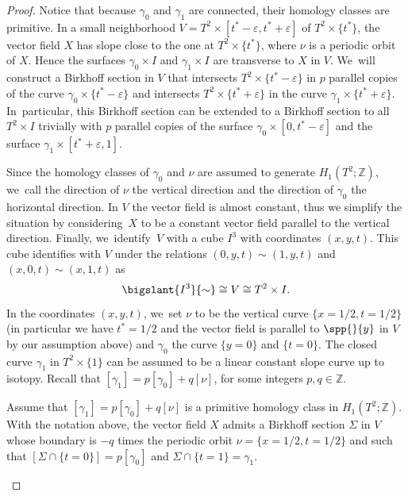 \begin{proof}
{Notice that because $\gamma_0$ and $\gamma_1$ are connected, their homology classes are primitive.} In a small neighborhood $V=T^2\times [t^*-\varepsilon,t^*+\varepsilon]$ of $T^2 \times \{t^*\}$, the vector field $X$ has slope close to the one at $T^2\times \{t^*
\}$, where $\nu$ is a periodic orbit of $X$. Hence the surfaces $\gamma_0\times I$ and $\gamma_1 \times I$ are transverse to $X$ in $V$. We~will construct a Birkhoff section in $V$ that intersects $T^2\times\{t^*-\varepsilon\}$ in $p$ parallel copies of the curve $\gamma_0 \times \{t^*-\varepsilon\}$ and intersects $T^2\times\{t^*+\varepsilon\}$ in the curve $\gamma_1\times \{t^*+\varepsilon\}$. In~particular, this Birkhoff section can be extended to a Birkhoff section to all $T^2\times I$ trivially with $p$ parallel copies of the surface $\gamma_0\times [0,t^*-\varepsilon]$ and the surface $\gamma_1 \times [t^*+\varepsilon,1]$.

{Since the homology classes of $\gamma_0$ and $\nu$ are assumed to generate $H_1(T^2;\mathbb{Z})$, we~call the direction of $\nu$ the vertical direction and the direction of $\gamma_0$ the horizontal direction.} In $V$ the vector field is almost constant, thus we simplify the situation by considering~$X$ to be a constant vector field parallel to the vertical direction. Finally, we~iden\-ti\-fy~$V$ with a cube $I^3$ with coordinates $(x,y,t)$. This cube identifies with $V$ under the relations $(0,y,t) \sim (1,y,t)$ and $(x,0,t) \sim (x,1,t)$ as
\[
\bigslant{I^3}{\sim} \cong V\cong T^2\times I.
\]
{In the coordinates $(x,y,t)$, we~set $\nu$ to be the vertical} curve $\{x=1/2,t=1/2\}$ (in particular we have $t^*=1/2$ and the vector field is parallel to $\spp{}{y}$ in $V$ by our assumption above) and $\gamma_0$ the curve $\{y=0\}$ and $\{t=0\}$.
The closed curve $\gamma_1$ in $T^2\times \{1\}$ can be assumed to be a linear constant slope curve up to isotopy. Recall that
$[\gamma_1]=p[\gamma_0]+ q[\nu]$,
for some integers $p,q\in \mathbb{Z}$.

\begin{lemma}\label{lem:Birk}
Assume that $[\gamma_1]=p [\gamma_0] + q [\nu]$ is a primitive homology class in $H_1(T^2;\mathbb{Z})$. With the notation above, the vector field $X$ admits a Birkhoff section $\Sigma$ in $V$ whose boundary is $-q$ times the periodic orbit $\nu=\{x=1/2, t=1/2\}$ and such that $[\Sigma\cap \{t=0\}] =p [\gamma_0]$ and $\Sigma \cap \{t=1\}=\gamma_1$.
\end{lemma}


\end{proof}
